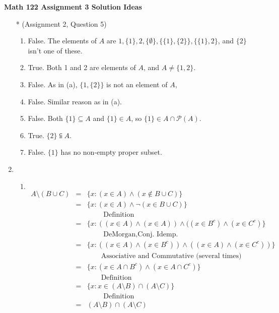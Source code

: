 \documentclass[12 pt]{article}
\begin{document}
{\bf Math 122 Assignment 3 Solution Ideas}
\begin{enumerate}

\item  [*] (Assignment 2, Question 5)\begin{enumerate}
\item False.  The elements of $A$ are $1, \{1\}, 2,   \{\emptyset\}, \{ \{1\}, \{2\}\}, \{\{1\},2\}$, and $\{2\}$ isn't one of these.
\item True.  Both 1 and 2 are elements of $A$, and $A \neq \{1, 2\}$.
\item False.  As in (a), $\{1, \{2\}\}$ is not an element of $A$,
\item False.  Similar reason as in (a).
\item False.  Both $\{1\} \subseteq A$ and $\{1\} \in A$, so $\{1\} \in A \cap \mathcal{P}(A)$.
\item True.  $\{2\} \subseteqq A$.
\item False. $\{1\}$ has no non-empty proper subset.
\end{enumerate}


\item \begin{enumerate}
\item $ $\\
$\begin{array}{rcl}

A \setminus (B \cup C) &=& \{x: (x \in A) \wedge (x \not\in B \cup C)\}\\
&=& \{x: (x \in A) \wedge \neg (x \in B \cup C)\}\\
&& \quad\quad \mbox{ Definition}\\
&=&  \{x: ((x \in A) \wedge (x \in A)) \wedge ((x \in B^c) \wedge (x \in C^c)\}\\
&& \quad\quad \mbox{ DeMorgan}, \mbox{Conj. Idemp.}\\
&=& \{x: ((x \in A) \wedge (x \in B^c)) \wedge ((x \in A) \wedge (x \in C^c))\}\\
&& \quad\quad\mbox{Associative and Commutative (several times)}\\
&=& \{x: (x \in A \cap B^c) \wedge (x \in A \cap C^c)\} \\
&& \quad\quad\mbox{Definition}\\
&=& \{x: x \in (A \setminus B) \cap (A \setminus C)\} \\
&& \quad\quad \mbox{ Definition}\\
 &=& (A \setminus B) \cap (A \setminus C)
 \end{array}$
 

\end{enumerate}
\end{enumerate}
\end{document}
